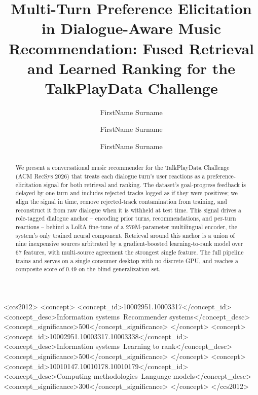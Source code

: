 \documentclass[sigconf]{acmart}
\begin{document}
\title{Multi-Turn Preference Elicitation in Dialogue-Aware Music Recommendation: Fused Retrieval and Learned Ranking for the TalkPlayData Challenge}

\author{FirstName Surname}

\author{FirstName Surname}

\author{FirstName Surname}

\renewcommand{\shortauthors}{Surname et al.}

\begin{abstract}
We present a conversational music recommender for the TalkPlayData Challenge (ACM
RecSys 2026) that treats each dialogue turn's user reactions as a preference-
elicitation signal for both retrieval and ranking. The dataset's goal-progress
feedback is delayed by one turn and includes rejected tracks logged as if they
were positives; we align the signal in time, remove rejected-track contamination
from training, and reconstruct it from raw dialogue when it is withheld at test
time. This signal drives a role-tagged dialogue anchor -- encoding prior turns,
recommendations, and per-turn reactions -- behind a LoRA fine-tune of a
279M-parameter multilingual encoder, the system's only trained neural component.
Retrieval around this anchor is a union of nine inexpensive sources arbitrated by
a gradient-boosted learning-to-rank model over 67 features, with multi-source
agreement the strongest single feature. The full pipeline trains and serves on a
single consumer desktop with no discrete GPU, and reaches a composite score of
0.49 on the blind generalization set.
\end{abstract}

\begin{CCSXML}
<ccs2012>
   <concept>
       <concept_id>10002951.10003317</concept_id>
       <concept_desc>Information systems~Recommender systems</concept_desc>
       <concept_significance>500</concept_significance>
   </concept>
   <concept>
       <concept_id>10002951.10003317.10003338</concept_id>
       <concept_desc>Information systems~Learning to rank</concept_desc>
       <concept_significance>500</concept_significance>
   </concept>
   <concept>
       <concept_id>10010147.10010178.10010179</concept_id>
       <concept_desc>Computing methodologies~Language models</concept_desc>
       <concept_significance>300</concept_significance>
   </concept>
</ccs2012>
\end{CCSXML}
\end{document}
